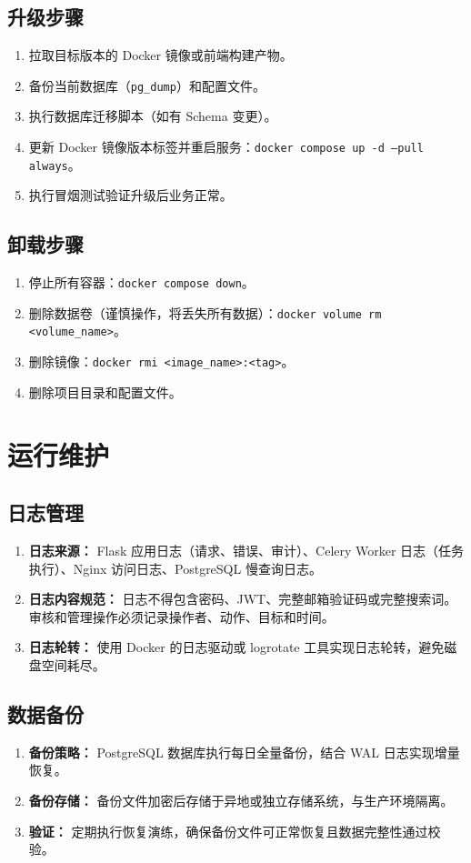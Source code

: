 \documentclass[12pt,a4paper]{ctexart}
\begin{document}
\subsection{升级步骤}
\begin{enumerate}
\item 拉取目标版本的 Docker 镜像或前端构建产物。
\item 备份当前数据库（\texttt{pg\_dump}）和配置文件。
\item 执行数据库迁移脚本（如有 Schema 变更）。
\item 更新 Docker 镜像版本标签并重启服务：\texttt{docker compose up -d --pull always}。
\item 执行冒烟测试验证升级后业务正常。
\end{enumerate}

\subsection{卸载步骤}
\begin{enumerate}
\item 停止所有容器：\texttt{docker compose down}。
\item 删除数据卷（谨慎操作，将丢失所有数据）：\texttt{docker volume rm <volume\_name>}。
\item 删除镜像：\texttt{docker rmi <image\_name>:<tag>}。
\item 删除项目目录和配置文件。
\end{enumerate}

\section{运行维护}
\subsection{日志管理}
\begin{enumerate}
\item \textbf{日志来源：} Flask 应用日志（请求、错误、审计）、Celery Worker 日志（任务执行）、Nginx 访问日志、PostgreSQL 慢查询日志。
\item \textbf{日志内容规范：} 日志不得包含密码、JWT、完整邮箱验证码或完整搜索词。审核和管理操作必须记录操作者、动作、目标和时间。
\item \textbf{日志轮转：} 使用 Docker 的日志驱动或 logrotate 工具实现日志轮转，避免磁盘空间耗尽。
\end{enumerate}

\subsection{数据备份}
\begin{enumerate}
\item \textbf{备份策略：} PostgreSQL 数据库执行每日全量备份，结合 WAL 日志实现增量恢复。
\item \textbf{备份存储：} 备份文件加密后存储于异地或独立存储系统，与生产环境隔离。
\item \textbf{验证：} 定期执行恢复演练，确保备份文件可正常恢复且数据完整性通过校验。
\end{enumerate}
\end{document}

